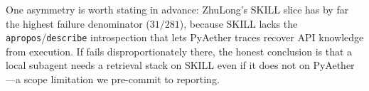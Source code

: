 One asymmetry is worth stating in advance: ZhuLong's SKILL slice has by far the highest failure denominator ($31/281$), because SKILL lacks the \texttt{apropos}/\texttt{describe} introspection that lets PyAether traces recover API knowledge from execution.
If \llm fails disproportionately there, the honest conclusion is that a local subagent needs a retrieval stack on SKILL even if it does not on PyAether---a scope limitation we pre-commit to reporting.
